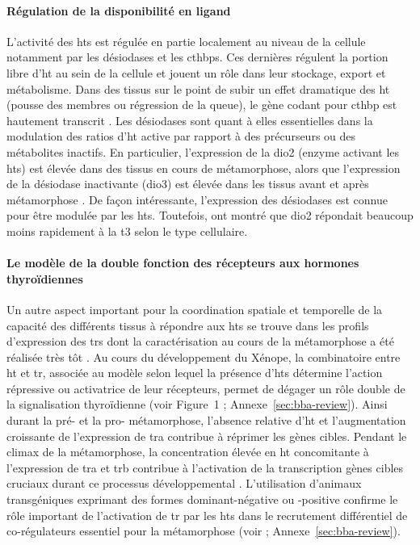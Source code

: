 \documentclass[../main.tex]{subfiles}
\begin{document}
\paragraph{Régulation de la disponibilité en ligand}
L'activité des \glspl{ht} est régulée en partie localement au niveau de la cellule notamment par les désiodases et les \glspl{cthbp}.
Ces dernières régulent la portion libre d'\gls{ht} au sein de la cellule et jouent un rôle dans leur stockage, export et métabolisme.
Dans des tissus sur le point de subir un effet dramatique des \gls{ht} (pousse des membres ou régression de la queue), le gène codant pour \gls{cthbp} est hautement transcrit \citep{Shi1994}.
Les désiodases sont quant à elles essentielles dans la modulation des ratios d'\gls{ht} active par rapport à des précurseurs ou des métabolites inactifs.
En particulier, l'expression de la \gls{dio2} (enzyme activant les \glspl{ht}) est élevée dans des tissus en cours de métamorphose, alors que l'expression de la désiodase inactivante (\gls{dio3}) est élevée dans les tissus avant et après métamorphose \citep{Leloup1981,Galton1989}.
De façon intéressante, l'expression des désiodases est connue pour être modulée par les \glspl{ht}. Toutefois, \citet{Bonett2010} ont montré que \gls{dio2} répondait beaucoup moins rapidement à la \gls{t3} selon le type cellulaire.

\paragraph{Le modèle de la double fonction des récepteurs aux hormones thyroïdiennes}
Un autre aspect important pour la coordination spatiale et temporelle de la capacité des différents tissus à répondre aux \glspl{ht} se trouve dans les profils d'expression des \glspl{tr} dont la caractérisation au cours de la métamorphose a été réalisée très tôt \citep{Yaoita1990}.
Au cours du développement du Xénope, la combinatoire entre \gls{ht} et \gls{tr}, associée au modèle selon lequel la présence d'\glspl{ht} détermine l'action répressive ou activatrice de leur récepteurs, permet de dégager un rôle double de la signalisation thyroïdienne (voir Figure~1 \citealp{Grimaldi2012}; Annexe~\ref{sec:bba-review}).
Ainsi durant la pré- et la pro- métamorphose, l'absence relative d'\gls{ht} et l'augmentation croissante de l'expression de \gls{tra} contribue à réprimer les gènes cibles.
Pendant le climax de la métamorphose, la concentration élevée en \gls{ht} concomitante à l'expression de \gls{tra} et \gls{trb} contribue à l'activation de la transcription gènes cibles cruciaux durant ce processus développemental \citep{Sachs2000}.
L'utilisation d'animaux transgéniques exprimant des formes dominant-négative \citep{Schreiber2001,Buchholz2003} ou -positive \citep{Buchholz2004} confirme le rôle important de l'activation de \gls{tr} par les \glspl{ht} dans le recrutement différentiel de co-régulateurs essentiel pour la métamorphose (voir \citealp{Grimaldi2012}; Annexe~\ref{sec:bba-review}).
\end{document}
